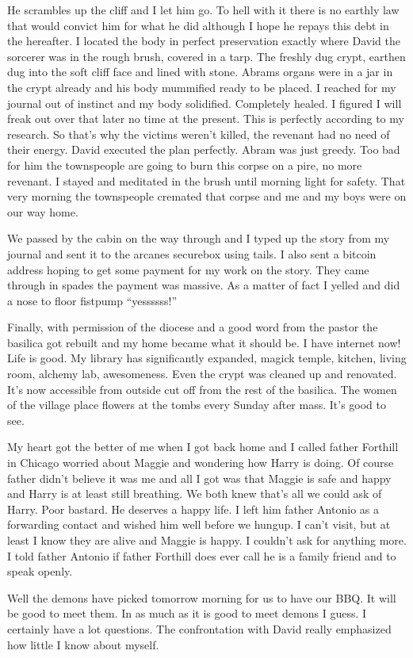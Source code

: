 He scrambles up the cliff and I let him go. To hell with it there is no earthly law that would convict him for what he did although I hope he repays this debt in the hereafter. I located the body in perfect preservation exactly where David the sorcerer was in the rough brush, covered in a tarp. The freshly dug crypt, earthen dug into the soft cliff face and lined with stone. Abrams organs were in a jar in the crypt already and his body mummified ready to be placed. I reached for my journal out of instinct and my body solidified. Completely healed. I figured I will freak out over that later no time at the present. This is perfectly according to my research. So that's why the victims weren't killed, the revenant had no need of their energy. David executed the plan perfectly. Abram was just greedy. Too bad for him the townspeople are going to burn this corpse on a pire, no more revenant. I stayed and meditated in the brush until morning light for safety. That very morning the townspeople cremated that corpse and me and my boys were on our way home.

We passed by the cabin on the way through and I typed up the story from my journal and sent it to the arcanes securebox using tails. I also sent a bitcoin address hoping to get some payment for my work on the story. They came through in spades the payment was massive. As a matter of fact I yelled and did a nose to floor fistpump ``yessssss!''

Finally, with permission of the diocese and a good word from the pastor the basilica got rebuilt and my home became what it should be. I have internet now! Life is good. My library has significantly expanded, magick temple, kitchen, living room, alchemy lab, awesomeness. Even the crypt was cleaned up and renovated. It's now accessible from outside cut off from the rest of the basilica. The women of the village place flowers at the tombs every Sunday after mass. It's good to see.

My heart got the better of me when I got back home and I called father Forthill in Chicago worried about Maggie and wondering how Harry is doing. Of course father didn't believe it was me and all I got was that Maggie is safe and happy and Harry is at least still breathing. We both knew that's all we could ask of Harry. Poor bastard. He deserves a happy life. I left him father Antonio as a forwarding contact and wished him well before we hungup. I can't visit, but at least I know they are alive and Maggie is happy. I couldn't ask for anything more. I told father Antonio if father Forthill does ever call he is a family friend and to speak openly.

Well the demons have picked tomorrow morning for us to have our BBQ. It will be good to meet them. In as much as it is good to meet demons I guess. I certainly have a lot questions. The confrontation with David really emphasized how little I know about myself.


